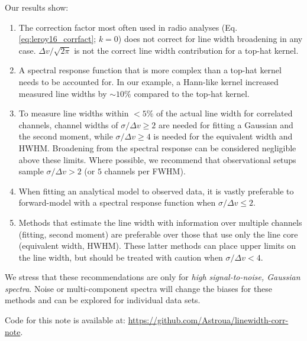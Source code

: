 \documentclass{rnaastex}
\begin{document}

Our results show:
\begin{enumerate}
    \item The correction factor most often used in radio analyses (Eq. \ref{eq:leroy16_corrfact}; $k=0$) does not correct for line width broadening in any case.  $\Delta v / \sqrt{2\pi}$ is not the correct line width contribution for a top-hat kernel.
    \item A spectral response function that is more complex than a top-hat kernel needs to be accounted for.  In our example, a Hann-like kernel increased measured line widths by $\sim10\%$ compared to the top-hat kernel.
    \item To measure line widths within $<5\%$ of the actual line width for correlated channels, channel widths of $\sigma / \Delta v \geq 2$ are needed for fitting a Gaussian and the second moment, while $\sigma / \Delta v \geq 4$ is needed for the equivalent width and HWHM. Broadening from the spectral response can be considered negligible above these limits.  Where possible, we recommend that observational setups sample $\sigma / \Delta v > 2$ (or $5$ channels per FWHM).
    \item When fitting an analytical model to observed data, it is vastly preferable to forward-model with a spectral response function when $\sigma / \Delta v \leq 2$.
    \item Methods that estimate the line width with information over multiple channels (fitting, second moment) are preferable over those that use only the line core (equivalent width, HWHM). These latter methods can place upper limits on the line width, but should be treated with caution when $\sigma / \Delta v <4$.
\end{enumerate}

We stress that these recommendations are only for {\it high signal-to-noise, Gaussian spectra}. Noise or multi-component spectra will change the biases for these methods and can be explored for individual data sets.

Code for this note is available at: \url{https://github.com/Astroua/linewidth-corr-note}.
\end{document}
